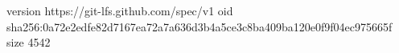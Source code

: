 version https://git-lfs.github.com/spec/v1
oid sha256:0a72e2edfe82d7167ea72a7a636d3b4a5ce3c8ba409ba120e0f9f04ec975665f
size 4542

